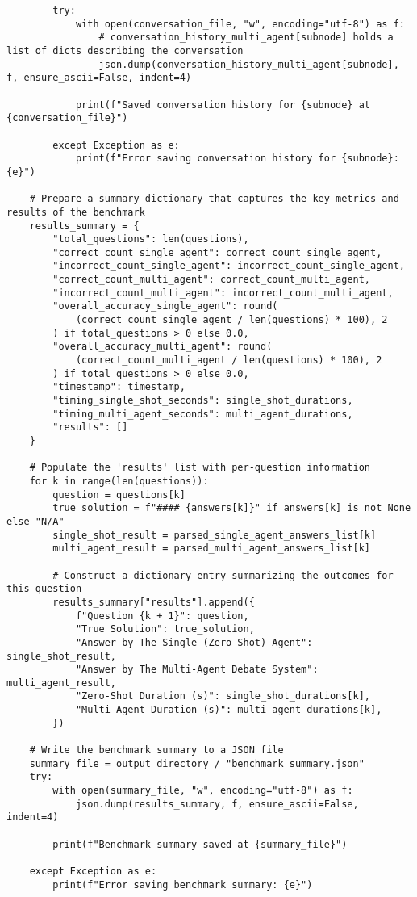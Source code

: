 \begin{lstlisting}
        try:
            with open(conversation_file, "w", encoding="utf-8") as f:
                # conversation_history_multi_agent[subnode] holds a list of dicts describing the conversation
                json.dump(conversation_history_multi_agent[subnode], f, ensure_ascii=False, indent=4)

            print(f"Saved conversation history for {subnode} at {conversation_file}")

        except Exception as e:
            print(f"Error saving conversation history for {subnode}: {e}")

    # Prepare a summary dictionary that captures the key metrics and results of the benchmark
    results_summary = {
        "total_questions": len(questions),
        "correct_count_single_agent": correct_count_single_agent,
        "incorrect_count_single_agent": incorrect_count_single_agent,
        "correct_count_multi_agent": correct_count_multi_agent,
        "incorrect_count_multi_agent": incorrect_count_multi_agent,
        "overall_accuracy_single_agent": round(
            (correct_count_single_agent / len(questions) * 100), 2
        ) if total_questions > 0 else 0.0,
        "overall_accuracy_multi_agent": round(
            (correct_count_multi_agent / len(questions) * 100), 2
        ) if total_questions > 0 else 0.0,
        "timestamp": timestamp,
        "timing_single_shot_seconds": single_shot_durations,
        "timing_multi_agent_seconds": multi_agent_durations,
        "results": []
    }

    # Populate the 'results' list with per-question information
    for k in range(len(questions)):
        question = questions[k]
        true_solution = f"#### {answers[k]}" if answers[k] is not None else "N/A"
        single_shot_result = parsed_single_agent_answers_list[k]
        multi_agent_result = parsed_multi_agent_answers_list[k]

        # Construct a dictionary entry summarizing the outcomes for this question
        results_summary["results"].append({
            f"Question {k + 1}": question,
            "True Solution": true_solution,
            "Answer by The Single (Zero-Shot) Agent": single_shot_result,
            "Answer by The Multi-Agent Debate System": multi_agent_result,
            "Zero-Shot Duration (s)": single_shot_durations[k],
            "Multi-Agent Duration (s)": multi_agent_durations[k],
        })

    # Write the benchmark summary to a JSON file
    summary_file = output_directory / "benchmark_summary.json"
    try:
        with open(summary_file, "w", encoding="utf-8") as f:
            json.dump(results_summary, f, ensure_ascii=False, indent=4)

        print(f"Benchmark summary saved at {summary_file}")

    except Exception as e:
        print(f"Error saving benchmark summary: {e}")
\end{lstlisting}
